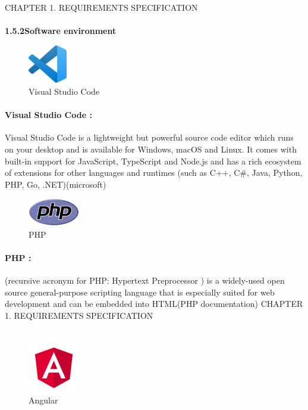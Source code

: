 \documentclass{article}
\begin{document}
\newpage
\noindent
CHAPTER 1.  REQUIREMENTS SPECIFICATION \\
\underline{\hspace{\textwidth}} \vspace{0.2cm}\\
{\large \textbf{1.5.2\hspace{1em}Software environment}}\vspace{0.2cm}
\begin{figure}[htbp]
    \centering
    \includegraphics[width=0.15\textwidth]{ddd}
    \caption{Visual Studio Code}
    \label{fig:design1}
\end{figure}

\paragraph{Visual Studio Code :} 
Visual Studio Code is a lightweight but powerful source code editor which runs on your desktop and is available for Windows, macOS and Linux. It comes with built-in support for JavaScript, TypeScript and Node.js and has a rich ecosystem of extensions for other languages and runtimes (such as C++, C\#, Java, Python, PHP, Go, .NET)(microsoft)

\vspace{1cm}

\begin{figure}[htbp]
    \centering
    \includegraphics[width=0.2\textwidth]{eee}
    \caption{PHP}
    \label{fig:design2}
\end{figure}

\paragraph{PHP :} 
(recursive acronym for PHP: Hypertext Preprocessor ) is a widely-used open source general-purpose scripting language that is especially suited for web development and can be embedded into HTML(PHP documentation)
\vspace{1cm}
\newpage
\noindent
CHAPTER 1.  REQUIREMENTS SPECIFICATION \\
\underline{\hspace{\textwidth}} \vspace{0.2cm}\\
\begin{figure}[htbp]
    \centering
    \includegraphics[width=0.2\textwidth]{ccc}
    \caption{Angular}
    \label{fig:design3}
\end{figure}
\end{document}

